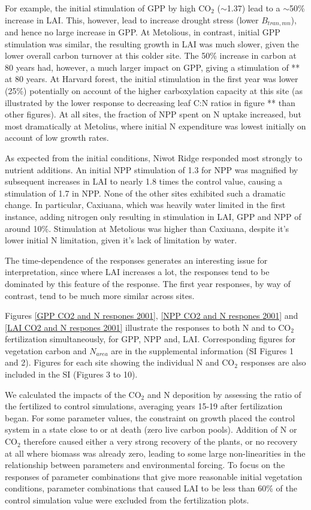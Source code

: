 \documentclass[draft,linenumbers]{agujournal}
\begin{document}
For example, the initial stimulation of GPP by high CO$_{2}$ ($\sim$1.37) lead to a $\sim$50\% increase in LAI. This, however, lead to increase drought stress (lower $B_{tran,mn}$), and hence no large increase in GPP. At Metolious, in contrast, initial GPP stimulation was similar, the resulting growth in LAI was much slower, given the lower overall carbon turnover at this colder site. The 50\% increase in  carbon at 80 years had, however, a much larger impact on GPP, giving a stimulation of ** at 80 years. 
 At Harvard forest, the initial stimulation in the first year was lower (25\%) potentially on account of the higher carboxylation capacity at this site (as illustrated by the lower response to decreasing leaf C:N ratios in figure ** than other figures).  At all sites, the fraction of NPP spent on N uptake increased, but most dramatically at Metolius, where initial N expenditure was lowest initially on account of low growth rates. 
 
As expected from the initial conditions, Niwot Ridge responded most strongly to nutrient additions. An initial NPP stimulation of 1.3 for NPP was magnified by subsequent increases in LAI to nearly 1.8 times the control value, causing a stimulation of 1.7 in NPP. None of the other sites exhibited such a dramatic change. In particular, Caxiuana, which was heavily water limited in the first instance, adding nitrogen only resulting in stimulation in LAI, GPP and NPP of around 10\%. Stimulation at Metolious was higher than Caxiuana, despite it's lower initial N limitation, given it's lack of limitation by water.

The time-dependence of the responses generates an interesting issue for interpretation, since where LAI increases a lot, the responses tend to be dominated by this feature of the response. The first year responses, by way of contrast, tend to be much more similar across sites. 




Figures \ref{GPP CO2 and N respones 2001}, \ref{NPP CO2 and N respones 2001} and \ref{LAI CO2 and N respones 2001} illustrate the responses to both N and to CO$_{2}$ fertilization simultaneously, for GPP, NPP and, LAI. Corresponding figures for vegetation carbon and $N_{area}$ are in the supplemental information (SI Figures 1 and 2). Figures for each site showing the individual N and CO$_{2}$ responses are also included in the SI (Figures 3 to 10).

We calculated the impacts of the CO$_{2}$ and N deposition by assessing the ratio of the fertilized to control simulations, averaging years 15-19 after fertilization began. For some parameter values, the constraint on growth placed the control system in a state close to or at death (zero live carbon pools). Addition of N or CO$_{2}$ therefore caused either a very strong recovery of the plants, or no recovery at all where biomass was already zero, leading to some large non-linearities in the relationship between parameters and environmental forcing. To focus on the responses of parameter combinations that give more reasonable initial vegetation conditions, parameter combinations that caused LAI to be less than 60\% of the control simulation value were excluded from the fertilization plots.
\end{document}
